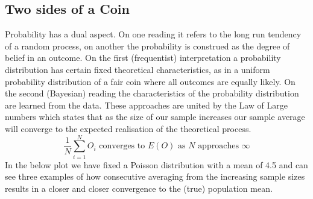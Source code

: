 \documentclass[10pt,a4paper,notitlepage, twocolumn]{article}
\begin{document}
\subsection*{Two sides of a Coin}
Probability has a dual aspect. On one reading it refers to the long run tendency of a random process, on another the probability is construed as the degree of belief in an outcome. On the first (frequentist) interpretation a probability distribution has certain fixed theoretical characteristics, as in a uniform probability distribution of a fair coin where all outcomes are equally likely. On the second (Bayesian) reading the characteristics of the probability distribution are learned from the data. These approaches are united by the Law of Large numbers which states that as the size of our sample increases our sample average will converge to the expected realisation of the theoretical process.
$$  \frac{1}{N} \sum_{i = 1}^{N} O_{i} \text{ converges to }  E(O) \text{ as } N \text{ approaches } \infty $$ 
In the below plot we have fixed a Poisson distribution with a mean of 4.5 and can see three examples of how consecutive averaging from the increasing sample sizes results in a closer and closer convergence to the (true) population mean.
\end{document}

